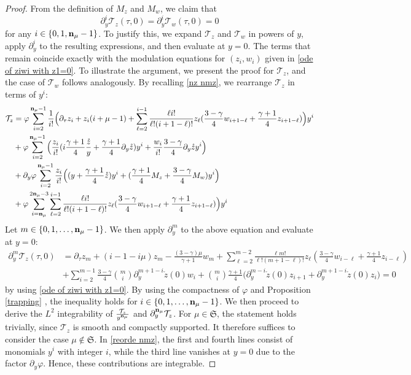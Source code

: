 \documentclass{article}
\newcommand{\ga}{\gamma}
\newcommand{\pa}{\partial}
\def\beqa{\begin{equation}\begin{aligned}}
\def\eeqa{\end{aligned}\end{equation}}
\def\mz{M_z}
\def\mw{M_w}
\def\nmz{\mathcal T_z}
\def\nmw{\mathcal T_w}
\def\ssmu{\mathfrak S}
\def\ndmu{{\bf{n}_{\mu}}}
\numberwithin{equation}{section}
\begin{document}
\begin{proof}
    From the definition of $\mz$ and $\mw$,  we claim that
    \[
        \pa_y^i\nmz(\tau,0) = \pa_y^i\nmw (\tau,0)=0
    \]
    for any $i\in\{0,1,\ndmu-1\}$. 
    To justify this, we expand $\nmz$ and $\nmw$ in powers of $y$, apply $\pa_y^i$ to the resulting expressions, and then evaluate at $y=0$. The terms that remain coincide exactly with the modulation equations for $(z_i,w_i)$ given in \eqref{ode of ziwi with z1=0}.
To illustrate the argument, we present the proof for $\nmz$, and the case of $\nmw$ follows analogously. 
    By recalling \eqref{nz nmz}, we rearrange $\nmz$ in terms of $y^i$: 
    \beqa\label{reorde nmz}
       \nmz &= \varphi\sum_{i=2}^{\ndmu-1}\frac{1}{i!}\Big(\pa_\tau z_i  + z_i (i +\mu-1)   +\sum_{\ell=2}^{i-1} \frac{\ell i!}{\ell! (i+1-\ell)!} z_{\ell}(\frac{3-\ga}{4} w_{i+1-\ell}+\frac{\ga+1}{4}z_{i+1-\ell}) \Big) y^i \\
        &+\varphi\sum_{i=2}^{\ndmu-1} \Big(\frac{z_i}{i!}(i\frac{\ga+1}{4}\frac{\mathring z}{y}+\frac{\ga+1}{4}\partial_y \mathring z ) y^i +\frac{w_i}{i!}\frac{3-\ga}{4}\partial_y \mathring z y^i\Big)  \\
        &+\pa_y\varphi\sum_{i=2}^{\ndmu-1}\frac{z_i}{i!} \Big((y+\frac{\ga+1}{4}\mathring z) y^i+  (\frac{\ga+1}{4}\mz+\frac{3-\ga}{4}\mw) y^i
        \Big) \\
      &+ \varphi \sum_{i=\ndmu}^{2\ndmu -3} \sum_{\ell=2}^{i-1} \frac{\ell i!}{\ell! (i+1-\ell)!} z_{\ell}(\frac{3-\ga}{4} w_{i+1-\ell}+\frac{\ga+1}{4}z_{i+1-\ell}) \Big) y^i
 \eeqa
    Let $m\in\{0,1,\dots,\ndmu-1\}$. We then apply $\pa_y^m$ to the above equation and evaluate at $y=0$:
    \begin{align*}
        \pa_y^m \nmz(\tau,0) &= \pa_\tau z_m + (i-1 -i\mu)z_m -\frac{(3-\ga)\mu}{\ga+1} w_m+  \sum_{\ell=2}^{m-2} \frac{\ell m!}{\ell! (m+1-\ell)!}z_\ell(\frac{3-\ga}{4} w_{i-\ell}+\frac{\ga+1}{4}z_{i-\ell}) \\
       &+\sum_{i=2}^{m-1}\frac{3-\ga}{4}  \binom{m}{i} \pa_y^{m+1-i} \mathring z(0)w_i+  \binom{m}{i} \frac{\ga+1}{4} \big(\pa_y^{m-i} \mathring z (0)z_{i+1}+ \pa_y^{m+1-i} \mathring z(0) z_i\big) =0 
    \end{align*}
       by using \eqref{ode of ziwi with z1=0}. By using the compactness of $\varphi$ and Proposition \ref{trapping} , the inequality holds for $i\in\{0,1,\dots,\ndmu-1\}$. 
   We then proceed to derive the $L^2$ integrability of $\frac{\nmz}{y^\ndmu}$ and $\pa_y^\ndmu \nmz$. For $\mu\in \ssmu$, the statement holds trivially, since $\nmz$ is smooth and compactly supported. It therefore suffices to consider the case $\mu\notin \ssmu$. In \eqref{reorde nmz}, the first and fourth lines consist of monomials $y^i$ with integer $i$, while the third line vanishes at $y=0$ due to the factor $\pa_y\varphi$. Hence, these contributions are integrable. 

\end{proof}
\end{document}
